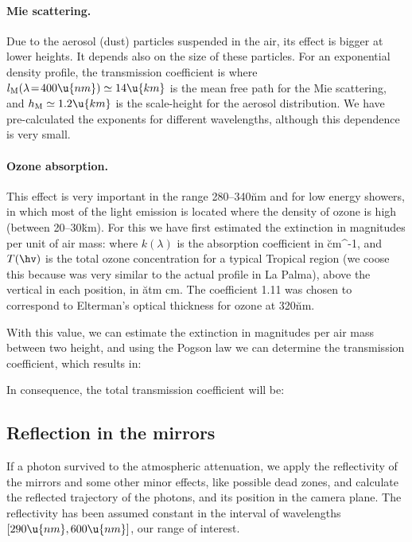 \paragraph{Mie scattering.} Due to the aerosol (dust)
particles suspended in the air, its effect is bigger at lower heights.
It depends also on the size of these particles. For an exponential
density profile, the transmission coefficient is
%
\Mieeq
%
where $l_{\mathrm{M}}(\lambda\!=\!400\u{nm}) \simeq 14\u{km}$ is the
mean free path for the Mie scattering, and $h_{\mathrm{M}} \simeq
1.2\u{km}$ is the scale-height for the aerosol distribution. We have
pre-calculated the exponents for different wavelengths, although this
dependence is very small.
  
\paragraph{Ozone absorption.} This effect is very important in the
range 280--340\u{nm} and for low energy showers, in which most of the
\Cherenkov light emission is located where the density of ozone is
high (between 20--30\u{km}). For this we have first estimated the
extinction in magnitudes per unit of air mass:
%
\amagneq
%
where $k(\lambda)$ is the absorption coefficient in \u{cm^{-1}}, and
$T(\hv)$ is the total ozone concentration for a typical Tropical
region (we coose this because was very similar to the actual profile
in La Palma), above the vertical in each position, in \u{atm cm}. The
coefficient 1.11 was chosen to correspond to Elterman's optical
thickness for ozone at 320\u{nm}\cite{Elterman:book}.

With this value, we can estimate the extinction in magnitudes per air
mass between two height, and using the Pogson law we can determine the
transmission coefficient, which results in:
%
\Ozoneeq

In consequence, the total transmission coefficient will be:
%
\TotalTransmissioneq

\subsection{Reflection in the mirrors}

If a photon survived to the atmospheric attenuation, we apply the
reflectivity of the mirrors and some other minor effects, like
possible dead zones, and calculate the reflected trajectory of the
photons, and its position in the camera plane. The reflectivity has
been assumed constant in the interval of wavelengths
$[290\u{nm},600\u{nm}]$, our range of interest.

